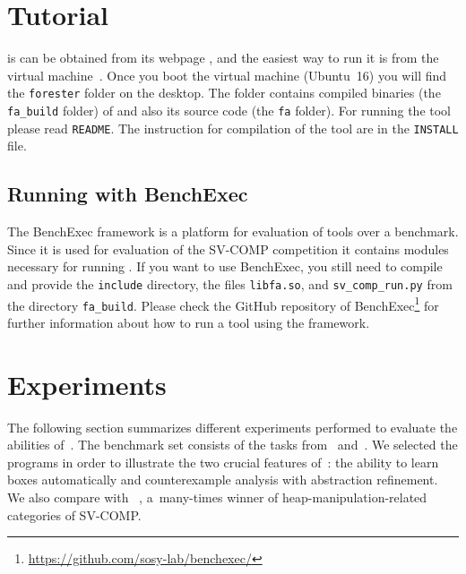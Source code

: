 {%


\section{Tutorial}\label{sec:tutorial}

\forester is can be obtained from its webpage \cite{foresterweb}, and the
easiest way to run it is from the virtual machine~\cite{zenodo}.
Once you boot the virtual machine (Ubuntu~16) you will find the \texttt{forester} folder
on the desktop.
The folder contains compiled binaries (the \texttt{fa\_build} folder) of \forester and also its source code (the \texttt{fa} folder).
For running the tool please read \texttt{README}.
The instruction for compilation of the tool are in the \texttt{INSTALL} file.

\subsection{Running \forester{} with BenchExec}

The BenchExec framework is a platform for evaluation of tools over a benchmark.
Since it is used for evaluation of the SV-COMP competition it contains modules necessary
for running \forester.
If you want to use BenchExec, you still need to compile \forester{} and provide the \texttt{include}
directory, the files \texttt{libfa.so}, and \texttt{sv\_comp\_run.py} from the directory \texttt{fa\_build}.
Please check the GitHub repository of BenchExec\footnote{\url{https://github.com/sosy-lab/benchexec/}} for further
information about how to run a tool using the framework.



\section{Experiments}\label{sec:exps}

The following section summarizes different experiments performed to evaluate
the abilities of~\forester{}.
The benchmark set consists of the tasks from~\cite{boxes13} and~\cite{vmcai17}.
We selected the programs in order to illustrate the two crucial features
of~\forester: the ability to learn boxes
automatically and counterexample analysis with abstraction refinement.
We also compare with \predator~\cite{predator11,dudka13sas}, a~many-times winner of
heap-manipulation-related categories of SV-COMP.

}
